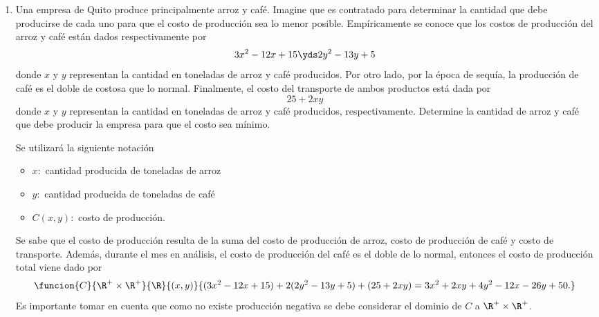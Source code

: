 \documentclass[a4,11pt]{aleph-examen}
\begin{document}
\begin{preguntas}
\begin{respuesta}
\begin{respuesta}
\begin{respuesta}
\begin{enumerate}
\begin{respuesta}
\[\begin{pmatrix}
            -2y-2z & 0 & z-2\lambda & y-2\lambda \\
            -2x-2z & z-2\lambda & 0 & x-2\lambda\\
            -2x-2y & y-2\lambda & x-2\lambda & 0
        \end{pmatrix}.        
    \]
    Se sabe que $m=1$ y $n=2$ entonces se calculará $(-1)^m\det H_{2m+1}$ y $(-1)^m\det H_{m+n}$ para cada punto crítico y se tiene
    \begin{align*}
        -\det H_{L_3}(a_1)<0 \texty -\det H_{L_4}(a_1)>0,\\
        -\det H_{L_3}(a_2)>0 \texty -\det H_{L_4}(a_2)<0,
    \end{align*}
    de donde, por la secuencia de los determinantes, se concluye que se tiene un máximo en $a_1$ y un punto de silla en $a_2$
\end{respuesta}

\item 
    Una empresa de Quito produce principalmente arroz y café. Imagine que es contratado para determinar la cantidad que debe producirse de cada uno para que el costo de producción sea lo menor posible. Empíricamente se conoce que los costos de producción del arroz y café están dados respectivamente por
	\[
		3x^2-12x+15\yds 2y^2-13y+5
	\]
	donde $x$ y $y$ representan la cantidad en toneladas de arroz y café producidos. Por otro lado, por la época de sequía, la producción de café es el doble de costosa que lo normal. Finalmente, el costo del transporte de ambos productos está dada por
	\[
		25 + 2xy
	\]
	donde $x$ y $y$ representan la cantidad en toneladas de arroz y café producidos, respectivamente. Determine la cantidad de arroz y café que debe producir la empresa para que el costo sea mínimo.


\begin{respuesta}
	Se utilizará la siguiente notación
	\begin{itemize}
	    \item $x:$ cantidad producida de toneladas de arroz
	    \item $y:$ cantidad producida de toneladas de café
	    \item $C(x,y):$ costo de producción.
	\end{itemize}
	Se sabe que el costo de producción resulta de la suma del costo de producción de arroz, costo de producción de café y costo de transporte. Además, durante el mes en análisis, el costo de producción del café es el doble de lo normal, entonces el costo de producción total viene dado por 
	\[
	\funcion{C}{\R^+\times \R^+}{\R}{(x,y)}{(3x^2-12x+15)+2(2y^2-13y+5)+(25+2xy)=3x^2+2xy+4y^2-12x-26y+50.}
	\]
	Es importante tomar en cuenta que como no existe producción negativa se debe considerar el dominio de $C$ a $\R^+\times \R^+$. 
	

\end{respuesta}
\end{enumerate}
\end{respuesta}
\end{respuesta}
\end{respuesta}
\end{preguntas}
\end{document}
